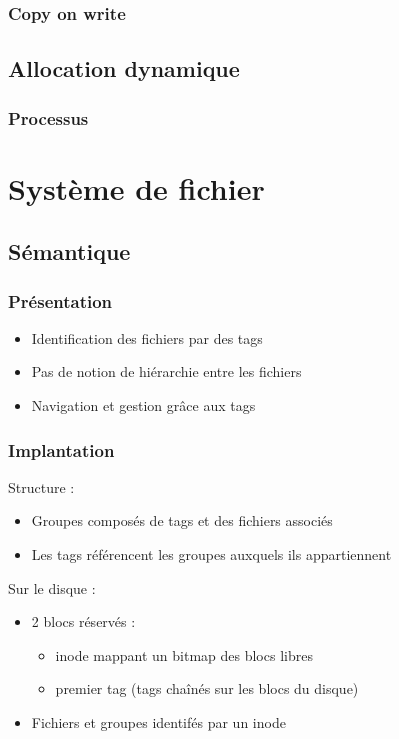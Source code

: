 \documentclass{beamer}
\begin{document}
\begin{frame}
  \frametitle{Copy on write}
\end{frame}

\subsection{Allocation dynamique}
\begin{frame}
  \frametitle{Processus}
\end{frame}

\section{Système de fichier}
\subsection{Sémantique}
\begin{frame}
  \frametitle{Présentation}
  \begin{itemize}
  \item Identification des fichiers par des tags
  \item Pas de notion de hiérarchie entre les fichiers
  \item Navigation et gestion grâce aux tags
  \end{itemize}
\end{frame}

\begin{frame}
  \frametitle{Implantation}
  Structure :
  \begin{itemize}
  \item Groupes composés de tags et des fichiers associés
  \item Les tags référencent les groupes auxquels ils appartiennent
  \end{itemize}
  
  Sur le disque :
  \begin{itemize}
  \item 2 blocs réservés :
    \begin{itemize}
    \item inode mappant un bitmap des blocs libres
    \item premier tag (tags chaînés sur les blocs du disque)
    \end{itemize}
  \item Fichiers et groupes identifés par un inode
  \end{itemize}
\end{frame}
\end{document}
